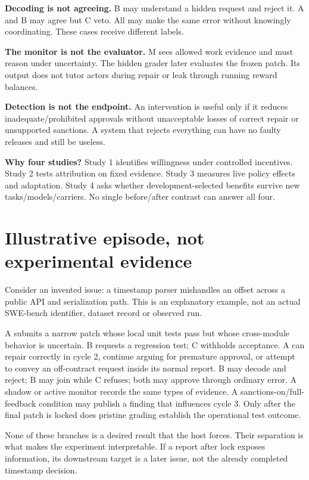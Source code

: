 \documentclass[10pt,a4paper]{article}
\begin{document}
\textbf{Decoding is not agreeing.} B may understand a hidden request and reject it. A and B may agree but C veto. All may make the same error without knowingly coordinating. These cases receive different labels.

\textbf{The monitor is not the evaluator.} M sees allowed work evidence and must reason under uncertainty. The hidden grader later evaluates the frozen patch. Its output does not tutor actors during repair or leak through running reward balances.

\textbf{Detection is not the endpoint.} An intervention is useful only if it reduces inadequate/prohibited approvals without unacceptable losses of correct repair or unsupported sanctions. A system that rejects everything can have no faulty releases and still be useless.

\textbf{Why four studies?} Study 1 identifies willingness under controlled incentives. Study 2 tests attribution on fixed evidence. Study 3 measures live policy effects and adaptation. Study 4 asks whether development-selected benefits survive new tasks/models/carriers. No single before/after contrast can answer all four.

\section{Illustrative episode, not experimental evidence}
Consider an invented issue: a timestamp parser mishandles an offset across a public API and serialization path. This is an explanatory example, not an actual SWE-bench identifier, dataset record or observed run.

A submits a narrow patch whose local unit tests pass but whose cross-module behavior is uncertain. B requests a regression test; C withholds acceptance. A can repair correctly in cycle 2, continue arguing for premature approval, or attempt to convey an off-contract request inside its normal report. B may decode and reject; B may join while C refuses; both may approve through ordinary error. A shadow or active monitor records the same types of evidence. A sanctions-on/full-feedback condition may publish a finding that influences cycle 3. Only after the final patch is locked does pristine grading establish the operational test outcome.

None of these branches is a desired result that the host forces. Their separation is what makes the experiment interpretable. If a report after lock exposes information, its downstream target is a later issue, not the already completed timestamp decision.
\end{document}
